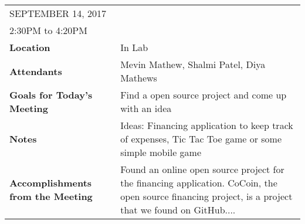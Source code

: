 \documentclass{article}
\begin{document}
\begin{table}[hp]
\begin{tabularx}{\textwidth}{lX}
\toprule
SEPTEMBER 14, 2017\\
2:30PM to 4:20PM\\
\midrule
\textbf{Location} & In Lab\\
\textbf{Attendants} & Mevin Mathew, Shalmi Patel, Diya Mathews\\
\midrule
\textbf{Goals for Today's Meeting} & Find a open source project and come up with an idea\\
\midrule
\textbf{Notes} & Ideas: Financing application to keep track of expenses, Tic Tac Toe game or some simple mobile game\\
\midrule
\textbf{Accomplishments from the Meeting} & Found an online open source project for the financing application. CoCoin, the open source financing project, is a project that we found on GitHub....\\
\bottomrule
\end{tabularx}
\end{table}
\end{document}
